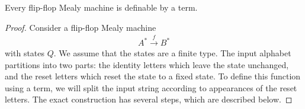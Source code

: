 \begin{lemma}\label{lem:terms-define-flip-flop}
        Every flip-flop Mealy machine is definable by a term.
\end{lemma}
\begin{proof}    
    Consider a flip-flop Mealy machine 
    \begin{align*}
    A^* \xrightarrow f B^*
    \end{align*}
    with states $Q$. We assume that the states are a finite type. 
    The input alphabet partitions into two parts: the identity letters which leave the state unchanged, and the reset letters which reset the state to a fixed state. To define this function using a term, we will split the input string according to appearances of the reset letters. The exact construction has several steps, which are described below.


\end{proof}
